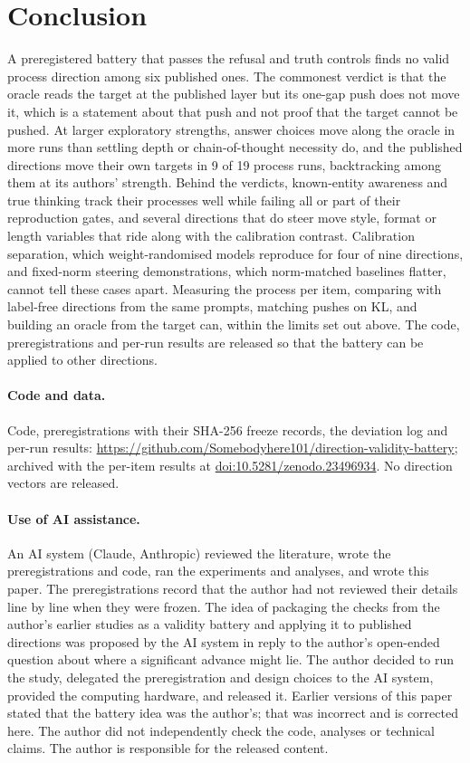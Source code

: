 \documentclass[11pt]{article}
\newif\ifanon
\begin{document}
\section{Conclusion}
A preregistered battery that passes the refusal and truth controls finds no valid process direction among six published ones. The commonest verdict is that the oracle reads the target at the published layer but its one-gap push does not move it, which is a statement about that push and not proof that the target cannot be pushed. At larger exploratory strengths, answer choices move along the oracle in more runs than settling depth or chain-of-thought necessity do, and the published directions move their own targets in 9 of 19 process runs, backtracking among them at its authors' strength. Behind the verdicts, known-entity awareness and true thinking track their processes well while failing all or part of their reproduction gates, and several directions that do steer move style, format or length variables that ride along with the calibration contrast. Calibration separation, which weight-randomised models reproduce for four of nine directions, and fixed-norm steering demonstrations, which norm-matched baselines flatter, cannot tell these cases apart. Measuring the process per item, comparing with label-free directions from the same prompts, matching pushes on KL, and building an oracle from the target can, within the limits set out above. The code, preregistrations and per-run results are released so that the battery can be applied to other directions.

\paragraph{Code and data.} \ifanon Links to the code, preregistrations and results are withheld for anonymous review.\else Code, preregistrations with their SHA-256 freeze records, the deviation log and per-run results: \url{https://github.com/Somebodyhere101/direction-validity-battery}; archived with the per-item results at \href{https://doi.org/10.5281/zenodo.23496934}{doi:10.5281/zenodo.23496934}.\fi{} No direction vectors are released.

\paragraph{Use of AI assistance.} An AI system (Claude, Anthropic) reviewed the literature, wrote the preregistrations and code, ran the experiments and analyses, and wrote this paper. The preregistrations record that the author had not reviewed their details line by line when they were frozen. The idea of packaging the checks from the author's earlier studies as a validity battery and applying it to published directions was proposed by the AI system in reply to the author's open-ended question about where a significant advance might lie. The author decided to run the study, delegated the preregistration and design choices to the AI system, provided the computing hardware, and released it. Earlier versions of this paper stated that the battery idea was the author's; that was incorrect and is corrected here. The author did not independently check the code, analyses or technical claims. The author is responsible for the released content.
\end{document}
